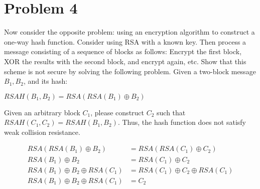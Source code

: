 \documentclass[11pt]{article}
\begin{document}
\vspace*{1in}
\section*{Problem 4}
Now consider the opposite problem: using an encryption algorithm to construct a
one-way hash function. Consider using RSA with a known key. Then process a
message consisting of a sequence of blocks as follows: Encrypt the first block,
XOR the results with the second block, and encrypt again, etc. Show that this
scheme is not secure by solving the following problem. Given a two-block
message
$B_1, B_2$, and its hash:

\begin{center}
    $RSAH(B_1, B_2) = RSA(RSA(B_1) \oplus B_2)$
\end{center}

Given an arbitrary block $C_1$, please construct $C_2$ such that \\
$RSAH(C_1, C_2) = RSAH(B_1, B_2)$. Thus, the hash function does not satisfy weak
collision resistance.

\begin{align*}
    RSA(RSA(B_1) \oplus B_2) &= RSA(RSA(C_1) \oplus C_2)\\
    RSA(B_1) \oplus B_2 &= RSA(C_1) \oplus C_2\\
    RSA(B_1) \oplus B_2 \oplus RSA(C_1) &= RSA(C_1) \oplus C_2 \oplus RSA(C_1)\\
    RSA(B_1) \oplus B_2 \oplus RSA(C_1) &= C_2
\end{align*}
\end{document}
